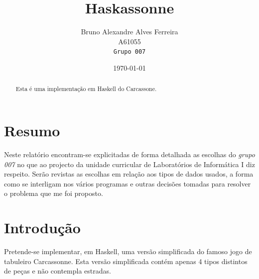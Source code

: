 \documentclass[11pt, a4paper, twoside]{article}
\begin{document}
\title{Haskassonne}
\date{\today}
\author{
  Bruno Alexandre Alves Ferreira\\
  {\small A61055}\\
  \texttt{Grupo 007}
}

\maketitle
\begin{abstract}
\begin{center}
  Esta é uma implementação em Haskell do Carcassone.
\end{center}
\end{abstract}
\newpage

\tableofcontents

\newpage
\section{Resumo}

Neste relatório encontram-se explicitadas de forma detalhada as escolhas do \textit{grupo 007} no que ao projecto da unidade curricular de Laboratórios de Informática I diz respeito. Serão revistas as escolhas em relação aos tipos de dados usados, a forma como se interligam nos vários programas e outras decisões tomadas para resolver o problema que me foi proposto.

\newpage
\section{Introdução}

Pretende-se implementar, em Haskell, uma versão simplificada do famoso jogo de tabuleiro Carcassonne. Esta versão simplificada contém apenas 4 tipos distintos de peças e não contempla estradas.
\end{document}
